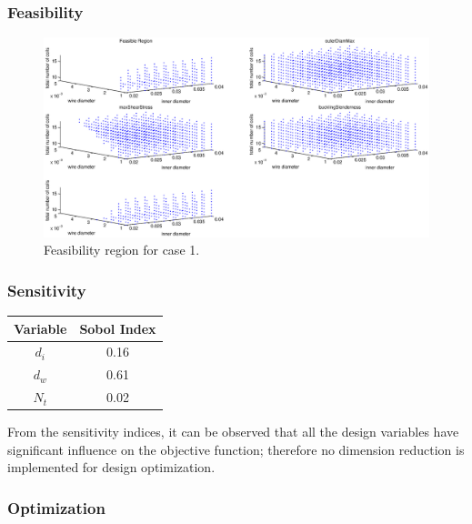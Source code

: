 \documentclass[10pt]{article}
\begin{document}
\newpage
	
	\subsubsection{Feasibility}
	
			\begin{figure}[h!]
		 \begin{center}\includegraphics[scale=.35]{Case_56_38910_Feasibility.eps}\end{center}
		 \caption{Feasibility region for case 1.}
		 \label{Feasibility region for case 1.}
		 \end{figure}

	
	\subsubsection{Sensitivity}
	
\begin{center}
	 \begin{tabular}{| c  | c |  }
	 	\hline Variable & Sobol Index\\
	 	\hline $d_{i}$ & 0.16 \\
		\hline $d_{w}$ & 0.61  \\
		\hline $N_{t}$ & 0.02 \\ 
		\hline
	 \end{tabular}
\end{center}

From the sensitivity indices, it can be observed that all the design variables have significant influence on the objective function; therefore no dimension reduction is implemented for design optimization. 

	\subsubsection{Optimization}
	
\end{document}
